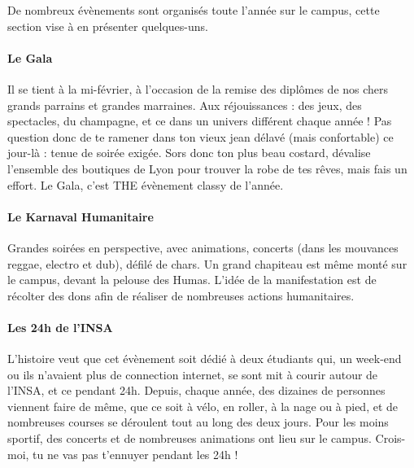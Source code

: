 De nombreux évènements sont organisés toute l'année sur le campus, cette section
vise à en présenter quelques-uns.

\paragraph{Le Gala}
Il se tient à la mi-février, à l'occasion de la remise des
diplômes de nos chers grands parrains et grandes marraines. Aux réjouissances :
des jeux, des spectacles, du champagne, et ce dans un univers différent chaque année !
Pas question donc de te ramener dans ton vieux jean délavé (mais confortable) ce
jour-là : tenue de soirée exigée. Sors donc ton plus beau costard, dévalise
l'ensemble des boutiques de Lyon pour trouver la robe de tes rêves, mais fais un
effort. Le Gala, c'est THE évènement classy de l'année.

\paragraph{Le Karnaval Humanitaire}
Grandes soirées en perspective, avec animations, concerts (dans les mouvances
reggae, electro et dub), défilé de chars. Un grand chapiteau est même monté sur le
campus, devant la pelouse des Humas. L'idée de la manifestation est de
récolter des dons afin de réaliser de nombreuses actions humanitaires.


 \paragraph{Les 24h de l'INSA}
 L'histoire veut que cet évènement soit dédié à deux étudiants qui, un
 week-end ou ils n'avaient plus de connection internet, se sont mit à courir
 autour de l'INSA, et ce pendant 24h. Depuis, chaque année, des dizaines de
 personnes viennent faire de même, que ce soit à vélo, en roller, à la nage ou à
 pied, et de nombreuses courses se déroulent tout au long des deux jours. Pour les
 moins sportif, des concerts et de nombreuses animations ont lieu sur le
 campus. Crois-moi, tu ne vas pas t'ennuyer pendant les 24h !

